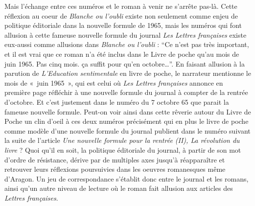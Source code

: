 Mais l’échange entre ces numéros et le roman à venir ne s’arrête pas-là. Cette réflexion au coeur de \emph{Blanche ou l’oubli} existe non seulement comme enjeu de politique éditoriale dans la nouvelle formule de 1965, mais les numéros qui font allusion à cette fameuse nouvelle formule du journal \emph{Les Lettres françaises} existe eux-aussi comme allusions dans \emph{Blanche ou l’oubli} : \enquote{Ce n’est pas très important, et il est vrai que ce roman n’a été inclus dans le Livre de poche qu’au mois de juin 1965. Pas cinq mois. ça suffit pour qu’en octobre…}. En faisant allusion à la parution de \emph{L’Education sentimentale} en livre de poche, le narrateur mentionne le mois de « juin 1965 », qui est celui où \emph{Les Lettres françaises} annonce en première page réfléchir à une nouvelle formule du journal à compter de la rentrée d’octobre. Et c’est justement dans le numéro du 7 octobre 65 que parait la fameuse nouvelle formule. Peut-on voir ainsi dans cette rêverie autour du Livre de Poche un clin d’oeil à ces deux numéros précisément qui en plus le livre de poche comme modèle d’une nouvelle formule du journal publient dans le numéro suivant la suite de l’article \emph{Une nouvelle formule pour la rentrée (II), La révolution du livre }? Quoi qu’il en soit, la politique éditoriale du journal, à partir de son mot d’ordre de résistance, dérive par de multiples axes jusqu’à réapparaître et retrouver leurs réflexions poursuivies dans les oeuvres romanesques même d’Aragon. Un jeu de correspondance s’établit donc entre le journal et les romans, ainsi qu’un autre niveau de lecture où le roman fait allusion aux articles des \emph{Lettres françaises}. 





